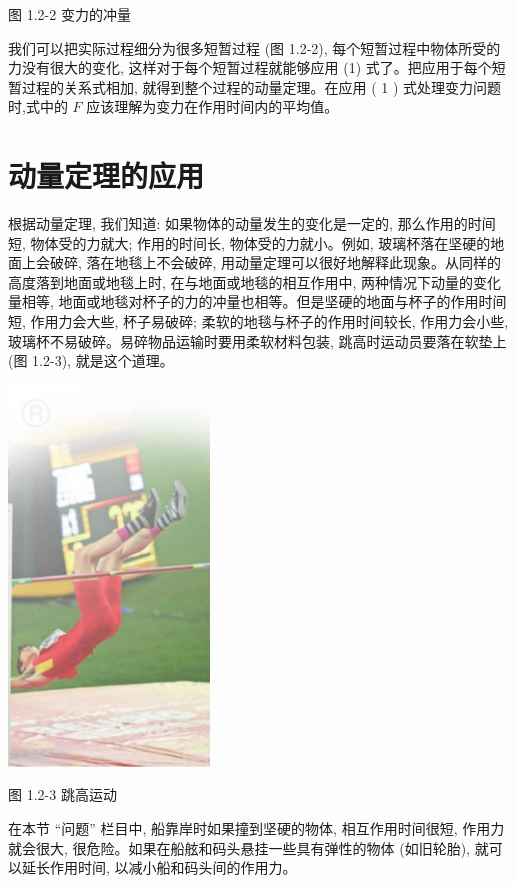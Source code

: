 \documentclass[10pt]{article}
\begin{document}
图 1.2-2 变力的冲量

我们可以把实际过程细分为很多短暂过程 (图 1.2-2), 每个短暂过程中物体所受的力没有很大的变化, 这样对于每个短暂过程就能够应用 (1) 式了。把应用于每个短暂过程的关系式相加, 就得到整个过程的动量定理。在应用 ( 1 ) 式处理变力问题时,式中的 \(F\) 应该理解为变力在作用时间内的平均值。

\section*{动量定理的应用}

根据动量定理, 我们知道: 如果物体的动量发生的变化是一定的, 那么作用的时间短, 物体受的力就大; 作用的时间长, 物体受的力就小。例如, 玻璃杯落在坚硬的地面上会破碎, 落在地毯上不会破碎, 用动量定理可以很好地解释此现象。从同样的高度落到地面或地毯上时, 在与地面或地毯的相互作用中, 两种情况下动量的变化量相等, 地面或地毯对杯子的力的冲量也相等。但是坚硬的地面与杯子的作用时间短, 作用力会大些, 杯子易破碎; 柔软的地毯与杯子的作用时间较长, 作用力会小些, 玻璃杯不易破碎。易碎物品运输时要用柔软材料包装, 跳高时运动员要落在软垫上 (图 1.2-3), 就是这个道理。

\begin{center}
\includegraphics[max width=0.4\textwidth]{images/01910e4c-ebb8-7d2c-8f2f-2375bc1d2d12_12_895594.jpg}
\end{center}

图 1.2-3 跳高运动

在本节 “问题” 栏目中, 船靠岸时如果撞到坚硬的物体, 相互作用时间很短, 作用力就会很大, 很危险。如果在船舷和码头悬挂一些具有弹性的物体 (如旧轮胎), 就可以延长作用时间, 以减小船和码头间的作用力。
\end{document}
